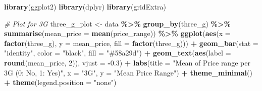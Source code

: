 \documentclass[
]{article}
\newenvironment{Shaded}{\begin{snugshade}}{\end{snugshade}}
\newcommand{\AttributeTok}[1]{\textcolor[rgb]{0.13,0.29,0.53}{#1}}
\newcommand{\CommentTok}[1]{\textcolor[rgb]{0.56,0.35,0.01}{\textit{#1}}}
\newcommand{\DecValTok}[1]{\textcolor[rgb]{0.00,0.00,0.81}{#1}}
\newcommand{\FloatTok}[1]{\textcolor[rgb]{0.00,0.00,0.81}{#1}}
\newcommand{\FunctionTok}[1]{\textcolor[rgb]{0.13,0.29,0.53}{\textbf{#1}}}
\newcommand{\NormalTok}[1]{#1}
\newcommand{\OtherTok}[1]{\textcolor[rgb]{0.56,0.35,0.01}{#1}}
\newcommand{\SpecialCharTok}[1]{\textcolor[rgb]{0.81,0.36,0.00}{\textbf{#1}}}
\newcommand{\StringTok}[1]{\textcolor[rgb]{0.31,0.60,0.02}{#1}}
\begin{document}
\begin{Shaded}
\begin{Highlighting}[]
\FunctionTok{library}\NormalTok{(ggplot2)}
\FunctionTok{library}\NormalTok{(dplyr)}
\FunctionTok{library}\NormalTok{(gridExtra)}

\CommentTok{\# Plot for 3G}
\NormalTok{three\_g\_plot }\OtherTok{\textless{}{-}}\NormalTok{ data }\SpecialCharTok{\%\textgreater{}\%}
  \FunctionTok{group\_by}\NormalTok{(three\_g) }\SpecialCharTok{\%\textgreater{}\%}
  \FunctionTok{summarise}\NormalTok{(}\AttributeTok{mean\_price =} \FunctionTok{mean}\NormalTok{(price\_range)) }\SpecialCharTok{\%\textgreater{}\%}
  \FunctionTok{ggplot}\NormalTok{(}\FunctionTok{aes}\NormalTok{(}\AttributeTok{x =} \FunctionTok{factor}\NormalTok{(three\_g), }\AttributeTok{y =}\NormalTok{ mean\_price, }\AttributeTok{fill =} \FunctionTok{factor}\NormalTok{(three\_g))) }\SpecialCharTok{+}
  \FunctionTok{geom\_bar}\NormalTok{(}\AttributeTok{stat =} \StringTok{"identity"}\NormalTok{, }\AttributeTok{color =} \StringTok{"black"}\NormalTok{, }\AttributeTok{fill =} \StringTok{"\#58a29d"}\NormalTok{) }\SpecialCharTok{+}
  \FunctionTok{geom\_text}\NormalTok{(}\FunctionTok{aes}\NormalTok{(}\AttributeTok{label =} \FunctionTok{round}\NormalTok{(mean\_price, }\DecValTok{2}\NormalTok{)), }\AttributeTok{vjust =} \SpecialCharTok{{-}}\FloatTok{0.3}\NormalTok{) }\SpecialCharTok{+}
  \FunctionTok{labs}\NormalTok{(}\AttributeTok{title =} \StringTok{"Mean of Price range per 3G (0: No, 1: Yes)"}\NormalTok{, }\AttributeTok{x =} \StringTok{"3G"}\NormalTok{, }\AttributeTok{y =} \StringTok{"Mean Price Range"}\NormalTok{) }\SpecialCharTok{+}
  \FunctionTok{theme\_minimal}\NormalTok{() }\SpecialCharTok{+}
  \FunctionTok{theme}\NormalTok{(}\AttributeTok{legend.position =} \StringTok{"none"}\NormalTok{)}


\end{Highlighting}
\end{Shaded}
\end{document}
